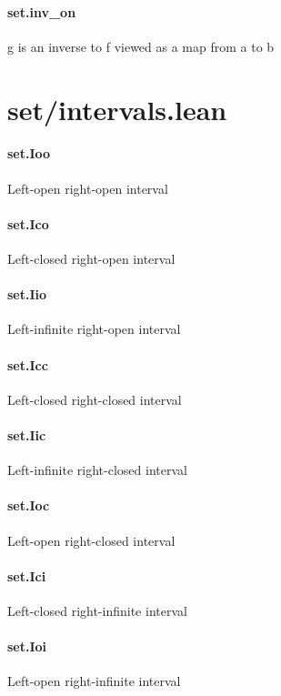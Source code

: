 \documentclass{article}
\begin{document}
\paragraph{set.inv\_on}
\par
\colorbox[RGB]{253,246,227}{{{{\color[RGB]{101, 123, 131} g }}}} is an inverse to 
\colorbox[RGB]{253,246,227}{{{{\color[RGB]{101, 123, 131} f }}}} viewed as a map from 
\colorbox[RGB]{253,246,227}{{{{\color[RGB]{101, 123, 131} a }}}} to 
\colorbox[RGB]{253,246,227}{{{{\color[RGB]{101, 123, 131} b }}}}\section{set/intervals.lean}\paragraph{set.Ioo}
\par
Left-open right-open interval
\paragraph{set.Ico}
\par
Left-closed right-open interval
\paragraph{set.Iio}
\par
Left-infinite right-open interval
\paragraph{set.Icc}
\par
Left-closed right-closed interval
\paragraph{set.Iic}
\par
Left-infinite right-closed interval
\paragraph{set.Ioc}
\par
Left-open right-closed interval
\paragraph{set.Ici}
\par
Left-closed right-infinite interval
\paragraph{set.Ioi}
\par
Left-open right-infinite interval
\end{document}

